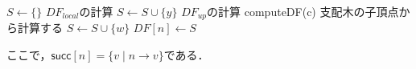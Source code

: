 \documentclass[dvipdfmx,a4j]{jbook}
\begin{document}
\begin{algorithm}[t]
    \centering
    \begin{minipage}{.7\textwidth}
        \begin{algorithmic}
            \caption{支配辺境の計算}\label{alg:dominanceFrontier}
            \State $S \gets \{\}$
               \Comment $DF_{local}$の計算
            \State $S \gets S\cup\{y\}$
            \EndIf
            \EndFor
              \Comment $DF_{up}$の計算
            \State computeDF(c) \Comment 支配木の子頂点から計算する
            \State $S\gets S\cup\{w\}$
            \EndIf
            \EndFor
            \EndFor
            \State $DF[n]\gets S$
            \EndProcedure
        \end{algorithmic}
    \end{minipage}
\end{algorithm}

ここで，$\mathsf{succ}[n]=\{v\;|\;n\rightarrow v\}$である．
\end{document}
